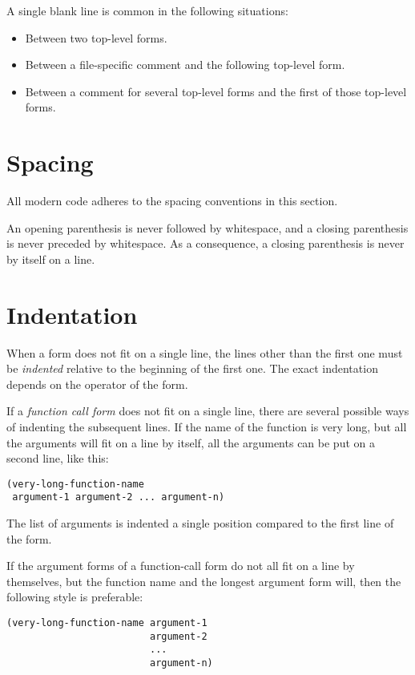 A single blank line is common in the following situations:

\begin{itemize}
\item Between two top-level forms.
\item Between a file-specific comment and the following top-level
  form.
\item Between a comment for several top-level forms and the first
  of those top-level forms.
\end{itemize}

\section{Spacing}

All modern \commonlisp{} code adheres to the spacing conventions in
this section.

An opening parenthesis is never followed by whitespace, and a closing
parenthesis is never preceded by whitespace.  As a consequence, a
closing parenthesis is never by itself on a line. 

\section{Indentation}

When a form does not fit on a single line, the lines other than the
first one must be \emph{indented} relative to the beginning of the
first one.  The exact indentation depends on the operator of the
form.

If a \emph{function call form} does not fit on a single line, there
are several possible ways of indenting the subsequent lines.  If the
name of the function is very long, but all the arguments will fit on a
line by itself, all the arguments can be put on a second line, like
this:

\begin{verbatim}
(very-long-function-name
 argument-1 argument-2 ... argument-n)
\end{verbatim}

The list of arguments is indented a single position compared to the
first line of the form.

If the argument forms of a function-call form do not all fit on a line
by themselves, but the function name and the longest argument form
will, then the following style is preferable:

\begin{verbatim}
(very-long-function-name argument-1
                         argument-2
                         ...
                         argument-n)
\end{verbatim}


